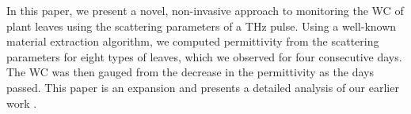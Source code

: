 \documentclass[preprints,article,accept,moreauthors,pdftex]{Definitions/mdpi}
\renewcommand{\^}{\hat}  %
\begin{document}
In this paper, we present a novel, non-invasive approach to monitoring the WC of plant leaves using the scattering parameters of a THz pulse. Using a well-known material extraction algorithm, we computed permittivity from the scattering parameters for eight types of leaves, which we observed for four consecutive days. The WC was then gauged from the decrease in the permittivity as the days passed. This paper is an expansion and presents a detailed analysis of our earlier work \cite{Zahid2018}. 
%
%
\end{document}
